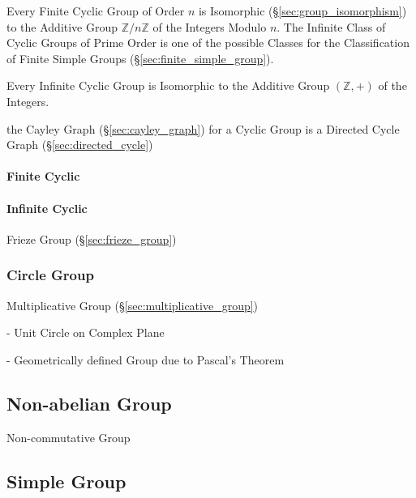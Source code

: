 Every Finite Cyclic Group of Order $n$ is Isomorphic
(\S\ref{sec:group_isomorphism}) to the Additive Group $\mathbb{Z}/n\mathbb{Z}$
of the Integers Modulo $n$. The Infinite Class of Cyclic Groups of Prime Order
is one of the possible Classes for the Classification of Finite Simple Groups
(\S\ref{sec:finite_simple_group}).

Every Infinite Cyclic Group is Isomorphic to the Additive Group $(\mathbb{Z},
+)$ of the Integers.

the Cayley Graph (\S\ref{sec:cayley_graph}) for a Cyclic Group is a
Directed Cycle Graph (\S\ref{sec:directed_cycle})



\paragraph{Finite Cyclic}\label{sec:finite_cyclic}\hfill

\paragraph{Infinite Cyclic}\label{sec:infinite_cyclic}\hfill

Frieze Group (\S\ref{sec:frieze_group})



\subsubsection{Circle Group}\label{sec:circle_group}

Multiplicative Group (\S\ref{sec:multiplicative_group})

- Unit Circle on Complex Plane

- Geometrically defined Group due to Pascal's Theorem
  \cite{lemmermeyer-shirali09}



\subsection{Non-abelian Group}\label{sec:noncommutative_group}

Non-commutative Group



\subsection{Simple Group}\label{sec:simple_group}

